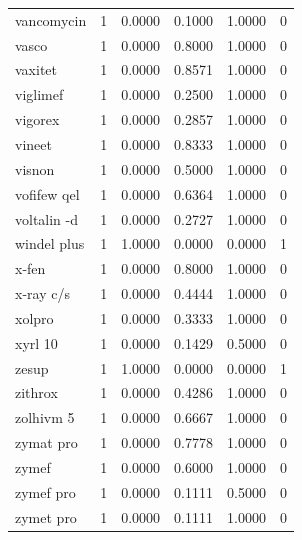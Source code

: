 \begin{longtable}{p{3.0cm}rrrrr}
vancomycin & 1 & 0.0000 & 0.1000 & 1.0000 & 0 \\
vasco & 1 & 0.0000 & 0.8000 & 1.0000 & 0 \\
vaxitet & 1 & 0.0000 & 0.8571 & 1.0000 & 0 \\
viglimef & 1 & 0.0000 & 0.2500 & 1.0000 & 0 \\
vigorex & 1 & 0.0000 & 0.2857 & 1.0000 & 0 \\
vineet & 1 & 0.0000 & 0.8333 & 1.0000 & 0 \\
visnon & 1 & 0.0000 & 0.5000 & 1.0000 & 0 \\
vofifew qel & 1 & 0.0000 & 0.6364 & 1.0000 & 0 \\
voltalin -d & 1 & 0.0000 & 0.2727 & 1.0000 & 0 \\
windel plus & 1 & 1.0000 & 0.0000 & 0.0000 & 1 \\
x-fen & 1 & 0.0000 & 0.8000 & 1.0000 & 0 \\
x-ray c/s & 1 & 0.0000 & 0.4444 & 1.0000 & 0 \\
xolpro & 1 & 0.0000 & 0.3333 & 1.0000 & 0 \\
xyrl 10 & 1 & 0.0000 & 0.1429 & 0.5000 & 0 \\
zesup & 1 & 1.0000 & 0.0000 & 0.0000 & 1 \\
zithrox & 1 & 0.0000 & 0.4286 & 1.0000 & 0 \\
zolhivm 5 & 1 & 0.0000 & 0.6667 & 1.0000 & 0 \\
zymat pro & 1 & 0.0000 & 0.7778 & 1.0000 & 0 \\
zymef & 1 & 0.0000 & 0.6000 & 1.0000 & 0 \\
zymef pro & 1 & 0.0000 & 0.1111 & 0.5000 & 0 \\
zymet pro & 1 & 0.0000 & 0.1111 & 1.0000 & 0 \\
\end{longtable}
\endgroup
